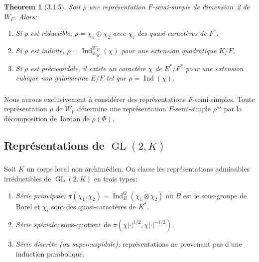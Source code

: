 \documentclass[11pt,a4paper]{amsart}
\theoremstyle{plain}
\newtheorem{theorem}{Theorem}[section]
\theoremstyle{definition}
\theoremstyle{remark}
\DeclareMathOperator{\GL}{GL}
\DeclareMathOperator{\Ind}{Ind}
\begin{document}
\subsubsection{}
\label{sec:3.1.5}

\begin{theorem}[3.1.5] \label{thm:3.1.5}
Soit $\rho$ une repr\'esentation $F$-semi-simple de dimension~2 de $W_F$. Alors:
\begin{enumerate}
\item[(a)] Si $\rho$ est r\'eductible, $\rho = \chi_1 \oplus \chi_2$ avec $\chi_i$ des quasi-caract\`eres de $F^*$.
\item[(b)] Si $\rho$ est induite, $\rho = \Ind_{W_K}^{W_F}(\chi)$ pour une extension quadratique $K/F$.
\item[(c)] Si $\rho$ est pr\'ecuspidale, il existe un caract\`ere $\chi$ de $E^*/F^*$ pour une extension cubique non galoisienne $E/F$ tel que $\rho = \Ind(\chi)$.
\end{enumerate}
\end{theorem}

\subsubsection{}
\label{sec:3.1.6}

Nous aurons exclusivement \`a consid\'erer des repr\'esentations $F$-semi-simples. Toute repr\'esentation $\rho$ de $W_F$ d\'etermine une repr\'esentation $F$-semi-simple $\rho^{ss}$ par la d\'ecomposition de Jordan de $\rho(\Phi)$.

\subsection{Repr\'esentations de $\GL(2,K)$}

\subsubsection{}
\label{sec:3.2.1}

Soit $K$ un corps local non archim\'edien. On classe les repr\'esentations admissibles irr\'eductibles de $\GL(2,K)$ en trois types:

\begin{enumerate}
\item[(I)] \emph{S\'erie principale:} $\pi(\chi_1, \chi_2) = \Ind_B^G(\chi_1 \otimes \chi_2)$ o\`u $B$ est le sous-groupe de Borel et $\chi_i$ sont des quasi-caract\`eres de $K^*$.
\item[(II)] \emph{S\'erie sp\'eciale:} sous-quotient de $\pi(\chi|\cdot|^{1/2}, \chi|\cdot|^{-1/2})$.
\item[(III)] \emph{S\'erie discr\`ete (ou supercuspidale):} repr\'esentations ne provenant pas d'une induction parabolique.
\end{enumerate}
\end{document}
